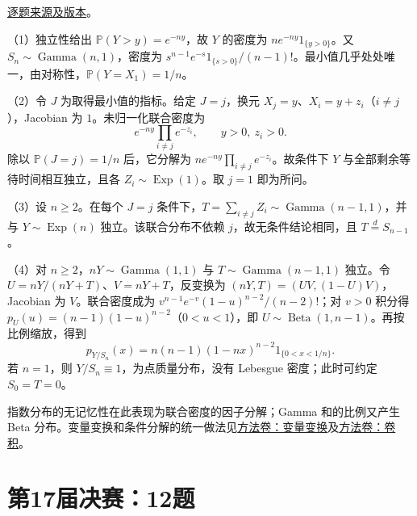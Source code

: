 \href{https://github.com/lzxcr/cmc-mathematics/blob/64916fa1fdbc3e444a652eca204d5669058ee321/src/problems/finals/16/15.md}{逐题来源及版本}。

\begin{solve}

（1）独立性给出 $\mathbb P(Y>y)=e^{-ny}$，故 $Y$ 的密度为 $ne^{-ny}1_{\{y>0\}}$。又 $S_n\sim\operatorname{Gamma}(n,1)$，密度为 $s^{n-1}e^{-s}1_{\{s>0\}}/(n-1)!$。最小值几乎处处唯一，由对称性，$\mathbb P(Y=X_1)=1/n$。

（2）令 $J$ 为取得最小值的指标。给定 $J=j$，换元 $X_j=y$、$X_i=y+z_i$（$i\ne j$），Jacobian 为 $1$。未归一化联合密度为
\[
e^{-ny}\prod_{i\ne j}e^{-z_i},\qquad y>0,\ z_i>0.
\]
除以 $\mathbb P(J=j)=1/n$ 后，它分解为 $ne^{-ny}\prod_{i\ne j}e^{-z_i}$。故条件下 $Y$ 与全部剩余等待时间相互独立，且各 $Z_i\sim\operatorname{Exp}(1)$。取 $j=1$ 即为所问。

（3）设 $n\ge2$。在每个 $J=j$ 条件下，$T=\sum_{i\ne j}Z_i\sim\operatorname{Gamma}(n-1,1)$，并与 $Y\sim\operatorname{Exp}(n)$ 独立。该联合分布不依赖 $j$，故无条件结论相同，且 $T\overset d=S_{n-1}$。

（4）对 $n\ge2$，$nY\sim\operatorname{Gamma}(1,1)$ 与 $T\sim\operatorname{Gamma}(n-1,1)$ 独立。令 $U=nY/(nY+T)$、$V=nY+T$，反变换为 $(nY,T)=(UV,(1-U)V)$，Jacobian 为 $V$。联合密度成为 $v^{n-1}e^{-v}(1-u)^{n-2}/(n-2)!$；对 $v>0$ 积分得 $p_U(u)=(n-1)(1-u)^{n-2}$（$0<u<1$），即 $U\sim\operatorname{Beta}(1,n-1)$。再按比例缩放，得到
\[
\boxed{p_{Y/S_n}(x)=n(n-1)(1-nx)^{n-2}1_{\{0<x<1/n\}}}.
\]
若 $n=1$，则 $Y/S_n\equiv1$，为点质量分布，没有 Lebesgue 密度；此时可约定 $S_0=T=0$。

\end{solve}

\begin{remark}[方法与条件]

指数分布的无记忆性在此表现为联合密度的因子分解；Gamma 和的比例又产生 Beta 分布。变量变换和条件分解的统一做法见\hyperref[app:probability-transforms]{方法卷：变量变换}及\hyperref[app:probability-convolution]{方法卷：卷积}。

\end{remark}

\section{第17届决赛：12题}\label{pr:fin17-high:12}

